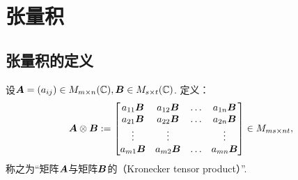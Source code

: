 \section{张量积}
\subsection{张量积的定义}
\begin{definition}
设\(\boldsymbol{A} = (a_{ij}) \in M_{m \times n}(\mathbb{C}),
\boldsymbol{B} \in M_{s \times t}(\mathbb{C})\).
定义：\begin{equation}
	\boldsymbol{A}\otimes\boldsymbol{B}
	:=
	\begin{bmatrix}
		a_{11} \boldsymbol{B} & a_{12} \boldsymbol{B} & \dots & a_{1n} \boldsymbol{B} \\
		a_{21} \boldsymbol{B} & a_{22} \boldsymbol{B} & \dots & a_{2n} \boldsymbol{B} \\
		\vdots & \vdots & & \vdots \\
		a_{m1} \boldsymbol{B} & a_{m2} \boldsymbol{B} & \dots & a_{mn} \boldsymbol{B}
	\end{bmatrix}
	\in M_{ms \times nt},
\end{equation}
称之为“矩阵\(\boldsymbol{A}\)与矩阵\(\boldsymbol{B}\)的（Kronecker tensor product）”.
\end{definition}


